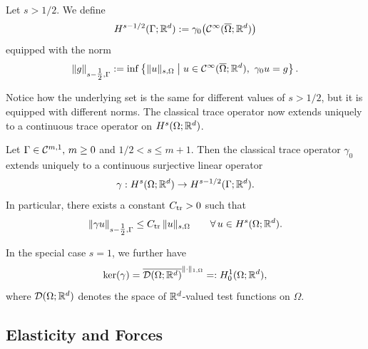 \begin{definition}\label{def:boundary_sobolev}
	Let $s>1/2$. We define
	\begin{equation*}
		H^{s-1/2}(\Gamma;{\mathbb R}^d):=\gamma_0\big({\mathcal C}^\infty(\overline{\Omega};{\mathbb R}^d)\big)
	\end{equation*}
	equipped with the norm
	\begin{equation*}
		\|g\|_{s-\tfrac12,\Gamma}
		:=
		\inf\left\{
		\|u\|_{s,\Omega}
		\;\middle|\;
		u\in {\mathcal C}^\infty(\overline{\Omega};{\mathbb R}^d),\ \gamma_0 u=g
		\right\}.
	\end{equation*}
\end{definition}

Notice how the underlying set is the same for different values of $s>1/2$, but it is equipped with different norms. The classical trace operator now extends uniquely to a continuous trace operator on $H^s(\Omega;{\mathbb R}^d)$.

\begin{theorem}\label{thm:trace}
	Let $\Gamma\in {\mathcal C}^{m,1},\, m\ge 0$ and $1/2< s\le m+1$. Then the classical trace operator $\gamma_0$ extends uniquely to a continuous surjective linear operator
	\begin{equation*}
		\gamma:H^s(\Omega;{\mathbb R}^d)\to H^{s-1/2}(\Gamma;{\mathbb R}^d).
	\end{equation*}
	In particular, there exists a constant $C_{{\mathrm{tr}}}>0$ such that
	\begin{equation*}
		\|\gamma u\|_{s-\tfrac12,\Gamma}\le C_{{\mathrm{tr}}}\,\|u\|_{s,\Omega}
		\qquad\forall\,u\in H^s(\Omega;{\mathbb R}^d).
	\end{equation*}\eop
\end{theorem}
In the special case $s=1$, we further have
\begin{equation*}
	\ker(\gamma)=\overline{{\mathcal D}(\Omega;{\mathbb R}^d)}^{\|\cdot\|_{1,\Omega}}=:H_0^1(\Omega;{\mathbb R}^d),
\end{equation*}
where ${\mathcal D}(\Omega;{\mathbb R}^d)$ denotes the space of ${\mathbb R}^d$-valued test functions on $\Omega$.

\subsection{Elasticity and Forces}\label{sec:elastforce}

